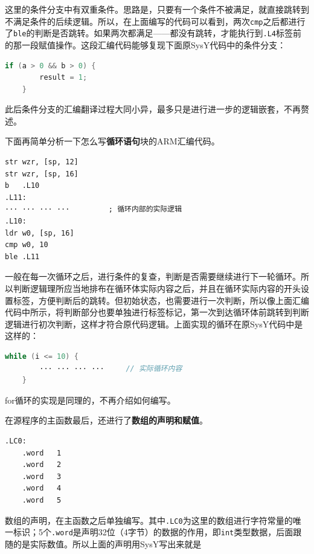 \documentclass[UTF8,a4paper,10pt]{ctexart}
\begin{document}
这里的条件分支中有双重条件。思路是，只要有一个条件不被满足，就直接跳转到不满足条件的后续逻辑。所以，在上面编写的代码可以看到，两次\texttt{cmp}之后都进行了\texttt{ble}的判断是否跳转。如果两次都满足——都没有跳转，才能执行到\texttt{.L4}标签前的那一段赋值操作。这段汇编代码能够复现下面原SysY代码中的条件分支：

\begin{lstlisting}[frame=trbl,language={C}]
    if (a > 0 && b > 0) {
        result = 1;
    }
\end{lstlisting}

此后条件分支的汇编翻译过程大同小异，最多只是进行进一步的逻辑嵌套，不再赘述。

\vspace{1em}

下面再简单分析一下怎么写\textbf{循环语句}块的ARM汇编代码。

\begin{lstlisting}[frame=trbl,language={[x86masm]Assembler}]
str	wzr, [sp, 12]
str	wzr, [sp, 16]
b	.L10
.L11:
··· ··· ··· ···         ; 循环内部的实际逻辑
.L10:
ldr	w0, [sp, 16]
cmp	w0, 10
ble	.L11
\end{lstlisting}

一般在每一次循环之后，进行条件的复查，判断是否需要继续进行下一轮循环。所以判断逻辑理所应当地排布在循环体实际内容之后，并且在循环实际内容的开头设置标签，方便判断后的跳转。但初始状态，也需要进行一次判断，所以像上面汇编代码中所示，将判断部分也要单独进行标签标记，第一次到达循环体前跳转到判断逻辑进行初次判断，这样才符合原代码逻辑。上面实现的循环在原SysY代码中是这样的：

\begin{lstlisting}[frame=trbl,language={C}]
    while (i <= 10) {       
        ··· ··· ··· ···     // 实际循环内容
    }
\end{lstlisting}

for循环的实现是同理的，不再介绍如何编写。

\vspace{1em}

在源程序的主函数最后，还进行了\textbf{数组的声明和赋值}。

\begin{lstlisting}[frame=trbl,language={[x86masm]Assembler}]
.LC0:
	.word	1
	.word	2
	.word	3
	.word	4
	.word	5
\end{lstlisting}

数组的声明，在主函数之后单独编写。其中\texttt{.LC0}为这里的数组进行字符常量的唯一标识；5个\texttt{.word}是声明32位（4字节）的数据的作用，即\texttt{int}类型数据，后面跟随的是实际数值。所以上面的声明用SysY写出来就是
\end{document}

